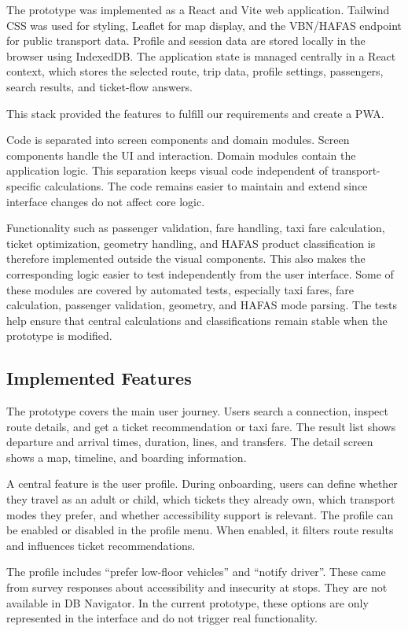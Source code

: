 \documentclass[12pt,a4paper]{article}
\begin{document}
The prototype was implemented as a React and Vite web application. Tailwind CSS was used for styling, Leaflet for map display, and the VBN/HAFAS endpoint for public transport data. Profile and session data are stored locally in the browser using IndexedDB. The application state is managed centrally in a React context, which stores the selected route, trip data, profile settings, passengers, search results, and ticket-flow answers.

This stack provided the features to fulfill our requirements and create a PWA.

Code is separated into screen components and domain modules. Screen components handle the UI and interaction. Domain modules contain the application logic. This separation keeps visual code independent of transport-specific calculations. The code remains easier to maintain and extend since interface changes do not affect core logic.

Functionality such as passenger validation, fare handling, taxi fare calculation, ticket optimization, geometry handling, and HAFAS product classification is therefore implemented outside the visual components. This also makes the corresponding logic easier to test independently from the user interface. Some of these modules are covered by automated tests, especially taxi fares, fare calculation, passenger validation, geometry, and HAFAS mode parsing. The tests help ensure that central calculations and classifications remain stable when the prototype is modified.

\subsection{Implemented Features}
The prototype covers the main user journey. Users search a connection, inspect route details, and get a ticket recommendation or taxi fare. The result list shows departure and arrival times, duration, lines, and transfers. The detail screen shows a map, timeline, and boarding information.

A central feature is the user profile. During onboarding, users can define whether they travel as an adult or child, which tickets they already own, which transport modes they prefer, and whether accessibility support is relevant. The profile can be enabled or disabled in the profile menu. When enabled, it filters route results and influences ticket recommendations.

The profile includes ``prefer low-floor vehicles'' and ``notify driver''. These came from survey responses about accessibility and insecurity at stops. They are not available in DB Navigator. In the current prototype, these options are only represented in the interface and do not trigger real functionality.
\end{document}
